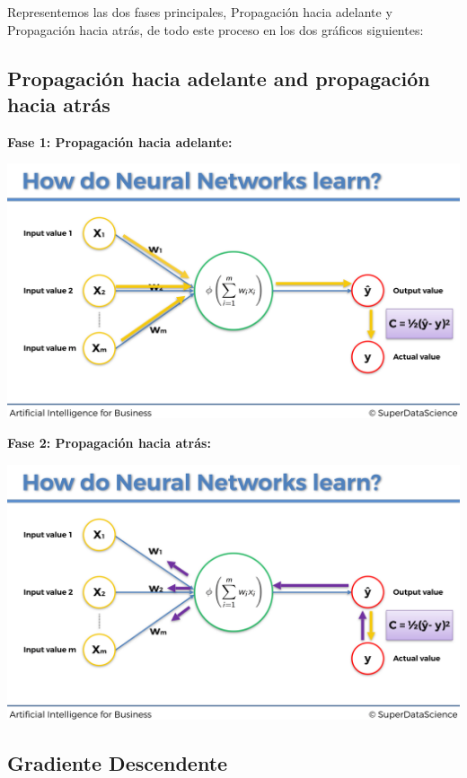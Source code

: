\documentclass[
]{book}
\begin{document}
Representemos las dos fases principales, Propagación hacia adelante y Propagación hacia atrás, de todo este proceso en los dos gráficos siguientes:

\hypertarget{propagaciuxf3n-hacia-adelante-and-propagaciuxf3n-hacia-atruxe1s}{%
\subsection{Propagación hacia adelante and propagación hacia atrás}\label{propagaciuxf3n-hacia-adelante-and-propagaciuxf3n-hacia-atruxe1s}}

\textbf{Fase 1: Propagación hacia adelante:}

\includegraphics{Images/ANN_18.png}

\textbf{Fase 2: Propagación hacia atrás:}

\includegraphics{Images/ANN_19.png}

\hypertarget{gradiente-descendente}{%
\subsection{Gradiente Descendente}\label{gradiente-descendente}}
\end{document}
